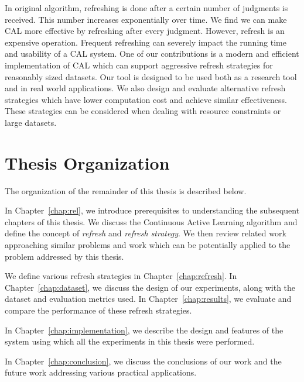 In original algorithm, refreshing is done after a certain number of judgments is
received. This number increases exponentially over time. We find we can make CAL
more effective by refreshing after every judgment. However, refresh is an
expensive operation. Frequent refreshing can severely impact the running time
and usability of a CAL system. One of our contributions is a modern and
efficient implementation of CAL which can support aggressive refresh strategies
for reasonably sized datasets. Our tool is designed to be used both as a
research tool and in real world applications.  We also design and evaluate
alternative refresh strategies which have lower computation cost and achieve similar
effectiveness.  These strategies can be considered when dealing with resource
constraints or large datasets.




\section{Thesis Organization}

The organization of the remainder of this thesis is described below.

In Chapter~\ref{chap:rel}, we introduce prerequisites to understanding the
subsequent chapters of this thesis. We discuss the Continuous Active Learning
algorithm and define the concept of \textit{refresh} and \textit{refresh
strategy}. We then review related work approaching similar problems and work
which can be potentially applied to the problem addressed by this thesis.

We define various refresh strategies in Chapter~\ref{chap:refresh}. In
Chapter~\ref{chap:dataset}, we discuss the design of our experiments, along with
the dataset and evaluation metrics used. In Chapter~\ref{chap:results}, we
evaluate and compare the performance of these refresh strategies.

In Chapter~\ref{chap:implementation}, we describe the design and features of
the system using which all the experiments in this thesis were
performed.

In Chapter~\ref{chap:conclusion}, we discuss the conclusions of our work
and the future work addressing various practical applications.
